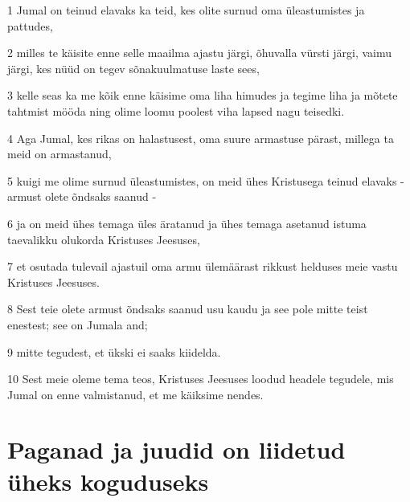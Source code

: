 \par 1 Jumal on teinud elavaks ka teid, kes olite surnud oma üleastumistes ja pattudes,
\par 2 milles te käisite enne selle maailma ajastu järgi, õhuvalla vürsti järgi, vaimu järgi, kes nüüd on tegev sõnakuulmatuse laste sees,
\par 3 kelle seas ka me kõik enne käisime oma liha himudes ja tegime liha ja mõtete tahtmist mööda ning olime loomu poolest viha lapsed nagu teisedki.
\par 4 Aga Jumal, kes rikas on halastusest, oma suure armastuse pärast, millega ta meid on armastanud,
\par 5 kuigi me olime surnud üleastumistes, on meid ühes Kristusega teinud elavaks - armust olete õndsaks saanud -
\par 6 ja on meid ühes temaga üles äratanud ja ühes temaga asetanud istuma taevalikku olukorda Kristuses Jeesuses,
\par 7 et osutada tulevail ajastuil oma armu ülemäärast rikkust helduses meie vastu Kristuses Jeesuses.
\par 8 Sest teie olete armust õndsaks saanud usu kaudu ja see pole mitte teist enestest; see on Jumala and;
\par 9 mitte tegudest, et ükski ei saaks kiidelda.
\par 10 Sest meie oleme tema teos, Kristuses Jeesuses loodud headele tegudele, mis Jumal on enne valmistanud, et me käiksime nendes.

\section*{Paganad ja juudid on liidetud üheks koguduseks}

